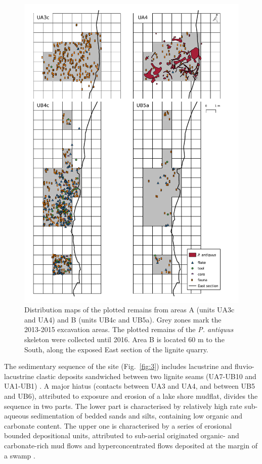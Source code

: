 \documentclass[preprint,authoryear,times]{elsarticle} %
\begin{document}
\begin{figure}[]
  \centering
  \includegraphics[width=.9\textwidth]{../artwork/Fig2.pdf}
  \caption{Distribution maps of the plotted remains from areas A (units UA3c and UA4) and B (units UB4c and UB5a). Grey zones mark the 2013-2015 excavation areas. The plotted remains of the \emph{P. antiquus} skeleton were collected until 2016. Area B is located 60 m to the South, along the exposed East section of the lignite quarry.}
  \label{fig:2}
\end{figure}

The sedimentary sequence of the site (Fig.~\ref{fig:3}) includes lacustrine and fluvio-lacustrine clastic deposits sandwiched between two lignite seams (UA7-UB10 and UA1-UB1) \citep{Karkanas}. A major hiatus (contacts between UA3 and UA4, and between UB5 and UB6), attributed to exposure and erosion of a lake shore mudflat, divides the sequence in two parts. The lower part is characterised by relatively high rate sub-aqueous sedimentation of bedded sands and silts, containing low organic and carbonate content. The upper one is characterised by a series of erosional bounded depositional units, attributed to sub-aerial originated organic- and carbonate-rich mud flows and hyperconcentrated flows deposited at the margin of a swamp \citep{Karkanas}.
\end{document}
